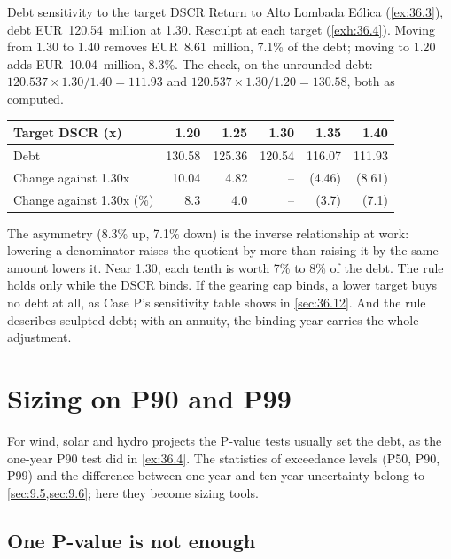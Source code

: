 \begin{example}{Debt sensitivity to the target DSCR \illustrative}\label{ex:36.5}
Return to Alto Lombada Eólica (\cref{ex:36.3}), debt EUR~120.54~million at 1.30\x. Resculpt at each target (\cref{exh:36.4}). Moving from 1.30\x{} to 1.40\x{} removes EUR~8.61~million, 7.1\% of the debt; moving to 1.20\x{} adds EUR~10.04~million, 8.3\%. The check, on the unrounded debt: $120.537 \times 1.30/1.40 = 111.93$ and $120.537 \times 1.30/1.20 = 130.58$, both as computed.
\end{example}

\begin{exhibit}[H]
\caption{Debt against target DSCR (EUR m) \illustrative}\label{exh:36.4}
\small
\begin{tabularx}{\linewidth}{@{}L rrrrr@{}}
\toprule
Target DSCR (x) & 1.20 & 1.25 & 1.30 & 1.35 & 1.40\\
\midrule
Debt & 130.58 & 125.36 & 120.54 & 116.07 & 111.93\\
Change against 1.30x & 10.04 & 4.82 & -- & (4.46) & (8.61)\\
Change against 1.30x (\%) & 8.3 & 4.0 & -- & (3.7) & (7.1)\\
\bottomrule
\end{tabularx}
\end{exhibit}

The asymmetry (8.3\% up, 7.1\% down) is the inverse relationship at work: lowering a denominator raises the quotient by more than raising it by the same amount lowers it. Near 1.30\x, each tenth is worth 7\% to 8\% of the debt. The rule holds only while the DSCR binds. If the gearing cap binds, a lower target buys no debt at all, as Case P's sensitivity table shows in \cref{sec:36.12}. And the rule describes sculpted debt; with an annuity, the binding year carries the whole adjustment.

\section{Sizing on P90 and P99}\label{sec:36.4}

For wind, solar and hydro projects the P-value tests usually set the debt, as the one-year P90 test did in \cref{ex:36.4}. The statistics of exceedance levels (P50, P90, P99) and the difference between one-year and ten-year uncertainty belong to \cref{sec:9.5,sec:9.6}; here they become sizing tools.

\subsection{One P-value is not enough}\label{ssec:36.4.1}

